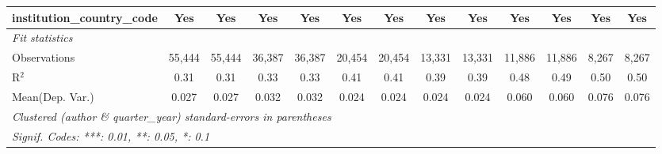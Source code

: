\begin{tabular}{lcccccccccccc}
   institution\_country\_code               & Yes            & Yes            & Yes            & Yes            & Yes          & Yes          & Yes          & Yes      & Yes           & Yes            & Yes           & Yes\\  
   \midrule
   \emph{Fit statistics}\\
   Observations                             & 55,444         & 55,444         & 36,387         & 36,387         & 20,454       & 20,454       & 13,331       & 13,331   & 11,886        & 11,886         & 8,267         & 8,267\\  
   R$^2$                                    & 0.31           & 0.31           & 0.33           & 0.33           & 0.41         & 0.41         & 0.39         & 0.39     & 0.48          & 0.49           & 0.50          & 0.50\\  
Mean(Dep. Var.) & 0.027 & 0.027 & 0.032 & 0.032 & 0.024 & 0.024 & 0.024 & 0.024 & 0.060 & 0.060 & 0.076 & 0.076 \\
   \midrule \midrule
   \multicolumn{13}{l}{\emph{Clustered (author \& quarter\_year) standard-errors in parentheses}}\\
   \multicolumn{13}{l}{\emph{Signif. Codes: ***: 0.01, **: 0.05, *: 0.1}}\\
\end{tabular}
\par\endgroup
